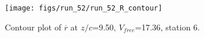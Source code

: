 \begin{figure}[H]
\centering
\texttt{[image: figs/run\_52/run\_52\_R\_contour]}
\caption{Contour plot of $\overline{r}$ at $z/c$=9.50, $V_{free}$=17.36, station 6.}
\label{fig:run_52_R_contour}
\end{figure}


